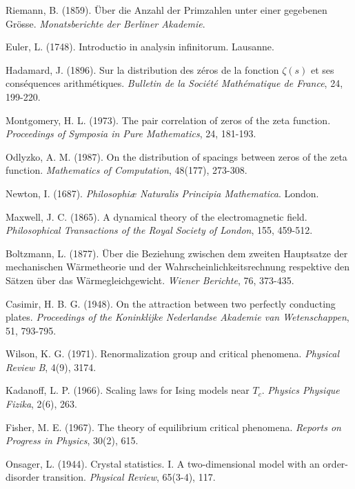 \documentclass[12pt,a4paper]{article}
\begin{document}
\begin{thebibliography}{99}

Riemann, B. (1859).
Über die Anzahl der Primzahlen unter einer gegebenen Grösse.
\textit{Monatsberichte der Berliner Akademie}.

Euler, L. (1748).
Introductio in analysin infinitorum.
Lausanne.

Hadamard, J. (1896).
Sur la distribution des zéros de la fonction $\zeta(s)$ et ses conséquences arithmétiques.
\textit{Bulletin de la Société Mathématique de France}, 24, 199-220.

Montgomery, H. L. (1973).
The pair correlation of zeros of the zeta function.
\textit{Proceedings of Symposia in Pure Mathematics}, 24, 181-193.

Odlyzko, A. M. (1987).
On the distribution of spacings between zeros of the zeta function.
\textit{Mathematics of Computation}, 48(177), 273-308.

Newton, I. (1687).
\textit{Philosophiæ Naturalis Principia Mathematica}.
London.

Maxwell, J. C. (1865).
A dynamical theory of the electromagnetic field.
\textit{Philosophical Transactions of the Royal Society of London}, 155, 459-512.

Boltzmann, L. (1877).
Über die Beziehung zwischen dem zweiten Hauptsatze der mechanischen Wärmetheorie und der Wahrscheinlichkeitsrechnung respektive den Sätzen über das Wärmegleichgewicht.
\textit{Wiener Berichte}, 76, 373-435.

Casimir, H. B. G. (1948).
On the attraction between two perfectly conducting plates.
\textit{Proceedings of the Koninklijke Nederlandse Akademie van Wetenschappen}, 51, 793-795.

Wilson, K. G. (1971).
Renormalization group and critical phenomena.
\textit{Physical Review B}, 4(9), 3174.

Kadanoff, L. P. (1966).
Scaling laws for Ising models near $T_c$.
\textit{Physics Physique Fizika}, 2(6), 263.

Fisher, M. E. (1967).
The theory of equilibrium critical phenomena.
\textit{Reports on Progress in Physics}, 30(2), 615.

Onsager, L. (1944).
Crystal statistics. I. A two-dimensional model with an order-disorder transition.
\textit{Physical Review}, 65(3-4), 117.


\end{thebibliography}
\end{document}
